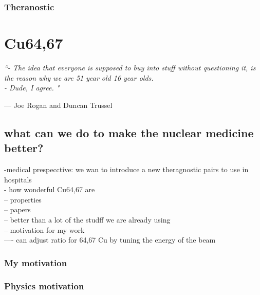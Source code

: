 \documentclass[twoside,english]{uiofysmaster/uiofysmaster}
\begin{document}
\subsection{Theranostic}
\label{sec:theranostic}





\chapter{Cu64,67} 
\label{ch: mywork}

\epigraph{\itshape ``- The idea that everyone is supposed to buy into stuff without questioning it, is the reason why we are 51 year old 16 year olds.\\ 
- Dude, I agree. "}{--- \textup{Joe Rogan and Duncan Trussel}}


\section{what can we do to make the nuclear medicine better?}
\label{sec: betterwork}

-medical prespecctive: we wan to introduce a new theragnostic pairs to use in hospitals\\
- how wonderful Cu64,67 are\\
-- properties\\
-- papers\\
-- better than a lot of the studff we are already using\\
-- motivation for my work\\
---- can adjust ratio for 64,67 Cu by tuning the energy of the beam\\



\subsection{My motivation}
\label{sec: my_motivation}




\subsection{Physics motivation}
\label{sec: physics_motivation}
\end{document}
